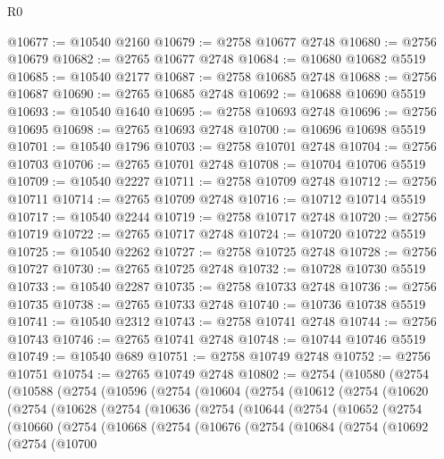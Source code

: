 \begin{lexlean}{R0}
\begin{coremodule}
@10677 := @10540 @2160
@10679 := @2758 @10677 @2748
@10680 := @2756 @10679
@10682 := @2765 @10677 @2748
@10684 := @10680 @10682 @5519
@10685 := @10540 @2177
@10687 := @2758 @10685 @2748
@10688 := @2756 @10687
@10690 := @2765 @10685 @2748
@10692 := @10688 @10690 @5519
@10693 := @10540 @1640
@10695 := @2758 @10693 @2748
@10696 := @2756 @10695
@10698 := @2765 @10693 @2748
@10700 := @10696 @10698 @5519
@10701 := @10540 @1796
@10703 := @2758 @10701 @2748
@10704 := @2756 @10703
@10706 := @2765 @10701 @2748
@10708 := @10704 @10706 @5519
@10709 := @10540 @2227
@10711 := @2758 @10709 @2748
@10712 := @2756 @10711
@10714 := @2765 @10709 @2748
@10716 := @10712 @10714 @5519
@10717 := @10540 @2244
@10719 := @2758 @10717 @2748
@10720 := @2756 @10719
@10722 := @2765 @10717 @2748
@10724 := @10720 @10722 @5519
@10725 := @10540 @2262
@10727 := @2758 @10725 @2748
@10728 := @2756 @10727
@10730 := @2765 @10725 @2748
@10732 := @10728 @10730 @5519
@10733 := @10540 @2287
@10735 := @2758 @10733 @2748
@10736 := @2756 @10735
@10738 := @2765 @10733 @2748
@10740 := @10736 @10738 @5519
@10741 := @10540 @2312
@10743 := @2758 @10741 @2748
@10744 := @2756 @10743
@10746 := @2765 @10741 @2748
@10748 := @10744 @10746 @5519
@10749 := @10540 @689
@10751 := @2758 @10749 @2748
@10752 := @2756 @10751
@10754 := @2765 @10749 @2748
@10802 := @2754
    (@10580
      (@2754
        (@10588
          (@2754
            (@10596
              (@2754
                (@10604
                  (@2754
                    (@10612
                      (@2754
                        (@10620
                          (@2754
                            (@10628
                              (@2754
                                (@10636
                                  (@2754
                                    (@10644
                                      (@2754
                                        (@10652
                                          (@2754
                                            (@10660
                                              (@2754
                                                (@10668
                                                  (@2754
                                                    (@10676
                                                      (@2754
                                                        (@10684
                                                          (@2754
                                                            (@10692
                                                              (@2754
                                                                (@10700

\end{coremodule}
\end{lexlean}
